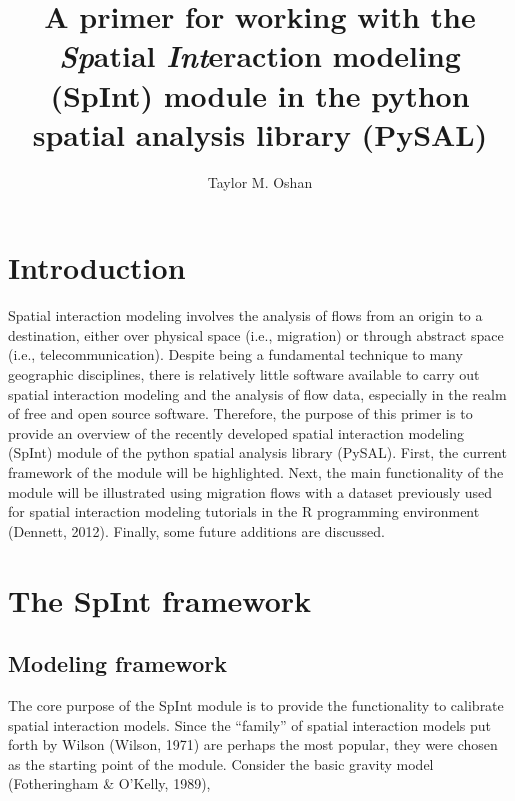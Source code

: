 \documentclass[11pt]{article}
\begin{document}
    
    \title{\texorpdfstring{A primer for working with the
\textbf{\emph{Sp}}atial \textbf{\emph{Int}}eraction modeling (SpInt)
module in the python spatial analysis library
(PySAL)}{A primer for working with the Spatial Interaction modeling (SpInt) module in the python spatial analysis library (PySAL)}}\label{a-primer-for-working-with-the-spatial-interaction-modeling-spint-module-in-the-python-spatial-analysis-library-pysal}

    \author{Taylor M. Oshan}
    
    \maketitle
    
   

    \section{Introduction}\label{introduction}

    Spatial interaction modeling involves the analysis of flows from an
origin to a destination, either over physical space (i.e., migration) or
through abstract space (i.e., telecommunication). Despite being a
fundamental technique to many geographic disciplines, there is relatively
little software available to carry out spatial interaction modeling and
the analysis of flow data, especially in the realm of free and open source software. Therefore, the purpose of this primer is to
provide an overview of the recently developed spatial interaction
modeling (SpInt) module of the python spatial analysis library (PySAL).
First, the current framework of the module will be highlighted. Next,
the main functionality of the module will be illustrated using migration
flows with a dataset previously used for spatial interaction modeling
tutorials in the R programming environment (Dennett, 2012). Finally, some future
additions are discussed.

    \section{The SpInt framework}\label{the-spint-framework}

    \subsection{Modeling framework}\label{modeling-framework}

    The core purpose of the SpInt module is to provide the functionality to
calibrate spatial interaction models. Since the ``family'' of spatial
interaction models put forth by Wilson (Wilson, 1971) are perhaps the
most popular, they were chosen as the starting point of the module.
Consider the basic gravity model (Fotheringham \& O'Kelly, 1989),
\end{document}
